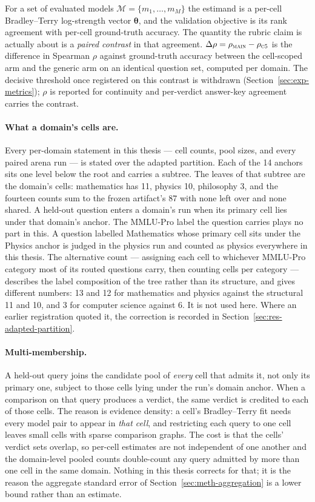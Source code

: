 For a set of evaluated models $\mathcal{M} = \{m_1, \ldots, m_M\}$ the
estimand is a per-cell Bradley--Terry log-strength vector
$\boldsymbol{\theta}$, and the validation objective is its rank
agreement with per-cell ground-truth accuracy. The quantity the
rubric claim is actually about is a \emph{paired contrast} in that
agreement. $\Delta\rho = \rho_{\textsc{main}} - \rho_{\textsc{c5}}$ is
the difference in Spearman $\rho$ against ground-truth accuracy between
the cell-scoped arm and the generic arm on an identical question set,
computed per domain.
The decisive threshold once registered on this contrast is withdrawn
(Section~\ref{sec:exp-metrics}); $\rho$ is reported for continuity
and per-verdict answer-key agreement carries the contrast.

\paragraph{What a domain's cells are.}\label{par:cell-count}
Every per-domain statement in this thesis --- cell counts, pool sizes,
and every paired arena run --- is stated over the adapted partition.
Each of the 14 anchors sits one level below the root and carries a
subtree. The leaves of that subtree are the domain's cells: mathematics
has 11, physics 10, philosophy 3, and the fourteen counts sum to the
frozen artifact's 87 with none left over and none shared.
A held-out question enters a domain's run when its primary cell lies
under that domain's anchor. The MMLU-Pro label the question carries
plays no part in this. A question labelled Mathematics whose primary
cell sits under the Physics anchor is judged in the physics run and
counted as physics everywhere in this thesis.
The alternative count --- assigning each cell to whichever MMLU-Pro
category most of its routed questions carry, then counting cells per
category --- describes the label composition of the tree rather than
its structure, and gives different numbers: 13 and 12 for mathematics
and physics against the structural 11 and 10, and 3 for computer
science against 6. It is not used here. Where an earlier registration
quoted it, the correction is recorded in
Section~\ref{sec:res-adapted-partition}.

\paragraph{Multi-membership.}
A held-out query joins the candidate pool of \emph{every} cell that
admits it, not only its primary one, subject to those cells lying under
the run's domain anchor. When a comparison on that query produces a
verdict, the same verdict is credited to each of those cells. The
reason is evidence density: a cell's Bradley--Terry fit needs every
model pair to appear in \emph{that cell}, and restricting each query to
one cell leaves small cells with sparse comparison graphs.
The cost is that the cells' verdict sets overlap, so per-cell estimates
are not independent of one another and the domain-level pooled counts
double-count any query admitted by more than one cell in the same
domain. Nothing in this thesis corrects for that; it is the reason the
aggregate standard error of
Section~\ref{sec:meth-aggregation} is a lower bound rather than an
estimate.

